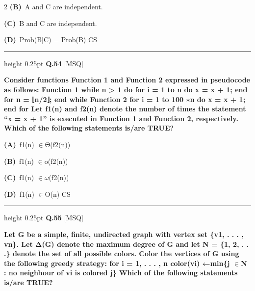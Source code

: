 \documentclass[a4paper,10pt,twoside]{article}
\begin{document}
\begin{multicols}{2}
\textbf{(B)}~A and C are independent.\par\vspace{2pt}\noindent
\textbf{(C)}~B and C are independent.\par\vspace{2pt}\noindent
\textbf{(D)}~Prob(B|C) = Prob(B) \newline CS
\par\vspace{6pt}\hrule height 0.25pt\vspace{6pt}
\noindent\textbf{Q.54} \hfill {\footnotesize\textsf{[MSQ]}}
\par\vspace{2pt}
{\bfseries Consider functions Function 1 and Function 2 expressed in pseudocode as
follows:
Function 1
while n > 1 do
for i = 1 to n do
x = x + 1;
end for
n = ⌊n/2⌋;
end while
Function 2
for i = 1 to 100 ∗n do
x = x + 1;
end for
Let f1(n) and f2(n) denote the number of times the statement ``x = x + 1'' is
executed in Function 1 and Function 2, respectively.
Which of the following statements is/are TRUE? \par}
\par\vspace{2pt}\noindent
\textbf{(A)}~f1(n) $\in$Θ(f2(n))\par\vspace{2pt}\noindent
\textbf{(B)}~f1(n) $\in$o(f2(n))\par\vspace{2pt}\noindent
\textbf{(C)}~f1(n) $\in$$\omega$(f2(n))\par\vspace{2pt}\noindent
\textbf{(D)}~f1(n) $\in$O(n) \newline CS
\par\vspace{6pt}\hrule height 0.25pt\vspace{6pt}
\noindent\textbf{Q.55} \hfill {\footnotesize\textsf{[MSQ]}}
\par\vspace{2pt}
{\bfseries Let G be a simple, ﬁnite, undirected graph with vertex set \{v1, . . . , vn\}. Let Δ(G)
denote the maximum degree of G and let N = \{1, 2, . . .\} denote the set of all possible
colors. Color the vertices of G using the following greedy strategy:
for i = 1, . . . , n
color(vi) ←min\{j $\in$N :
no neighbour of vi is colored j\}
Which of the following statements is/are TRUE? \par}
\par\vspace{2pt}\noindent
$$
\end{multicols}
\end{document}
